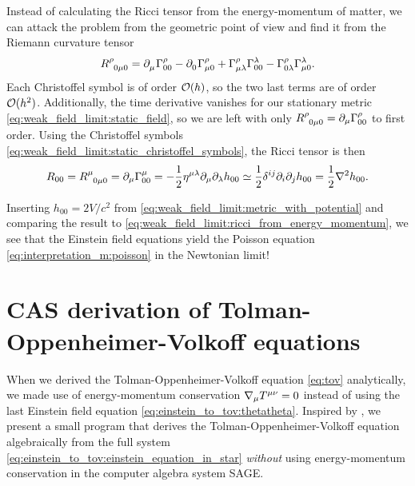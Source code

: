 Instead of calculating the Ricci tensor from the energy-momentum of matter, we can attack the problem from the geometric point of view and find it from the Riemann curvature tensor
\begin{equation}
	R\indices{^\rho_0_\mu_0} =
	\partial\indices{_\mu} \Gamma^\rho_{0 0} -
	\partial\indices{_0} \Gamma^{\rho}_{\mu 0} +
	\Gamma^\rho_{\mu \lambda} \Gamma^{\lambda}_{0 0} -
	\Gamma^\rho_{0 \lambda} \Gamma^{\lambda}_{\mu 0} .
\end{equation}
Each Christoffel symbol is of order $\mathcal{O}(h)$, so the two last terms are of order $\mathcal{O}(h^2)$.
Additionally, the time derivative vanishes for our stationary metric \eqref{eq:weak_field_limit:static_field}, so we are left with only $R\indices{^\rho_0_\mu_0} = \partial_\mu \Gamma^\rho_{00}$ to first order.
Using the Christoffel symbols \eqref{eq:weak_field_limit:static_christoffel_symbols}, the Ricci tensor is then
\begin{equation}
	R_{00} =       R\indices{^\mu_{0 \mu 0}}
		   = \partial_\mu \Gamma^\mu_{00}
		   = -\frac12 \eta^{\mu \lambda} \partial_\mu \partial_\lambda h_{00}
		   \taylor  \frac12 \delta^{i j} \partial_i \partial_j h_{00}
		   =        \frac12 \nabla^2 h_{00} .
	\label{eq:weak_field_limit:ricci_from_riemann}
\end{equation}

Inserting $h_{00} = 2V/c^2$ from \cref{eq:weak_field_limit:metric_with_potential} and comparing the result to \cref{eq:weak_field_limit:ricci_from_energy_momentum}, we see that the Einstein field equations yield the Poisson equation \eqref{eq:interpretation_m:poisson} in the Newtonian limit!

\section{CAS derivation of Tolman-Oppenheimer-Volkoff equations}
\label{sec:tov_cas_derivation}

When we derived the Tolman-Oppenheimer-Volkoff equation \eqref{eq:tov} analytically, we made use of energy-momentum conservation $\nabla_\mu T\indices{^\mu^\nu} = 0$ instead of using the last Einstein field equation \cref{eq:einstein_to_tov:thetatheta}.
Inspired by \cite{ref:sage_tov}, we present a small program that derives the Tolman-Oppenheimer-Volkoff equation algebraically from the full system \eqref{eq:einstein_to_tov:einstein_equation_in_star} \emph{without} using energy-momentum conservation in the computer algebra system SAGE.

